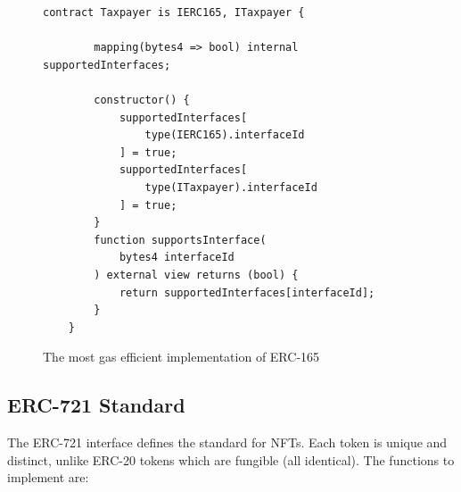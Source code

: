 \documentclass[conference]{IEEEtran}
\begin{document}
\begin{figure}
\centering
\begin{lstlisting}[style=soliditystyle, basicstyle=\ttfamily\footnotesize]
    contract Taxpayer is IERC165, ITaxpayer {
        
        mapping(bytes4 => bool) internal supportedInterfaces;

        constructor() {
            supportedInterfaces[
                type(IERC165).interfaceId
            ] = true;
            supportedInterfaces[
                type(ITaxpayer).interfaceId
            ] = true;
        }
        function supportsInterface(
            bytes4 interfaceId
        ) external view returns (bool) {
            return supportedInterfaces[interfaceId];
        }
    }
\end{lstlisting}
\caption{The most gas efficient implementation of ERC-165}
\label{code:erc165}
\end{figure}

\subsection{ERC-721 Standard}
The ERC-721 interface defines the standard for NFTs.
Each token is unique and distinct, unlike ERC-20 tokens which are fungible (all identical).
The functions to implement are:
\end{document}
